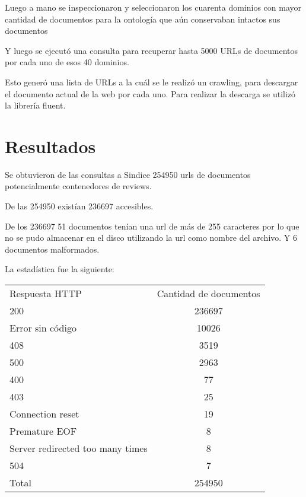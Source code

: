 Luego a mano se inspeccionaron y seleccionaron los cuarenta dominios con mayor cantidad de documentos para la ontología que aún conservaban intactos sus documentos

Y luego se ejecutó una consulta para recuperar hasta 5000 URLs de documentos por cada uno de esos 40 dominios.

Esto generó una lista de URLs a la cuál se le realizó un crawling, para descargar el documento actual de la web por cada uno. Para realizar la descarga se utilizó la librería fluent.

\section{Resultados}
\label{section:recoleccion-resultados}

Se obtuvieron de las consultas a Sindice 254950 urls de documentos potencialmente contenedores de reviews.

De las 254950 existían 236697 accesibles.

De los 236697 51 documentos tenían una url de más de 255 caracteres por lo que no se pudo almacenar en el disco utilizando la url como nombre del archivo. Y 6 documentos malformados.

La estadística fue la siguiente:

\begin{tabular}{| l | c | }
   Respuesta HTTP & Cantidad de documentos \\
   200 & 236697 \\
   Error sin código & 10026 \\
   408 & 3519 \\
   500 & 2963 \\
   400 & 77 \\
   403 & 25 \\
   Connection reset & 19 \\
   Premature EOF & 8 \\
   Server redirected too many times & 8 \\
   504 & 7 \\
   Total & 254950 \\
 \end{tabular}

